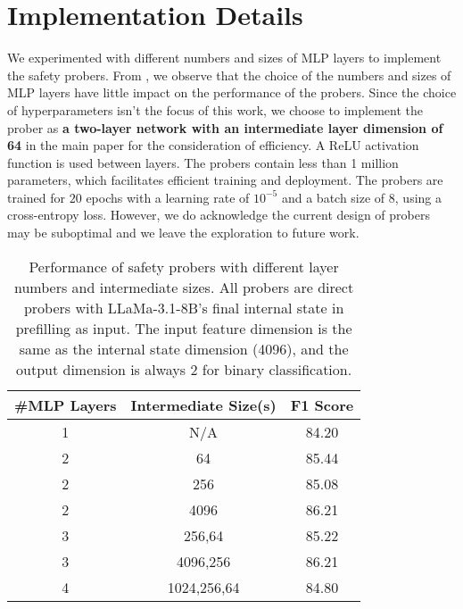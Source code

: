 \onecolumn


\appendix
\section{Implementation Details}
\label{app:training}
We experimented with different numbers and sizes of MLP layers to implement the safety probers. From , we observe that the choice of the numbers and sizes of MLP layers have little impact on the performance of the probers. Since the choice of hyperparameters isn't the focus of this work, we choose to implement the prober as \textbf{a two-layer network with an intermediate layer dimension of 64} in the main paper for the consideration of efficiency. A ReLU activation function is used between layers. The probers contain less than 1 million parameters, which facilitates efficient training and deployment. The probers are trained for $20$ epochs with a learning rate of $10^{-5}$ and a batch size of $8$, using a cross-entropy loss. However, we do acknowledge the current design of probers may be suboptimal and we leave the exploration to future work. 


\begin{table}[]
\caption{Performance of safety probers with different layer numbers and intermediate sizes. All probers are direct probers with LLaMa-3.1-8B's final internal state in prefilling as input. The input feature dimension is the same as the internal state dimension (4096), and the output dimension is always 2 for binary classification.}
\label{table:prober_size}
\vspace{2mm}
\centering
\renewcommand{\arraystretch}{1.1}
\begin{tabular}{ccc}
\hline
\#MLP Layers & Intermediate Size(s) & F1 Score \\\hline
1                     & N/A                  & 84.20        \\
2                     & 64                   & 85.44        \\
2                    & 256                  & 85.08       \\
2                     & 4096                 & 86.21        \\
3                     & 256,64               & 85.22        \\
3                    & 4096,256             & 86.21      \\
4                     & 1024,256,64          & 84.80        \\\hline
\end{tabular}
\end{table}


